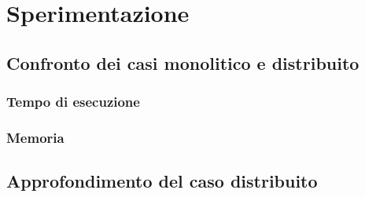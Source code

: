 \chapter{Sperimentazione}
\section{Confronto dei casi monolitico e distribuito}
\subsection{Tempo di esecuzione}

\subsection{Memoria}

\section{Approfondimento del caso distribuito}
